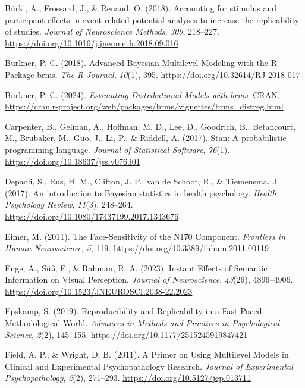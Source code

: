 \documentclass[
  doc,12pt,floatsintext]{apa7}
\newlength{\cslhangindent}
\newenvironment{CSLReferences}[2] %
 {\begin{list}{}{%
  \setlength{\itemindent}{0pt}
  \setlength{\leftmargin}{0pt}
  \setlength{\parsep}{0pt}
  \ifodd #1
   \setlength{\leftmargin}{\cslhangindent}
   \setlength{\itemindent}{-1\cslhangindent}
  \fi
  \setlength{\itemsep}{#2\baselineskip}}}
 {\end{list}}
\begin{document}
\begin{CSLReferences}{1}{0}
Bürki, A., Frossard, J., \& Renaud, O. (2018). Accounting for stimulus and participant effects in event-related potential analyses to increase the replicability of studies. \emph{Journal of Neuroscience Methods}, \emph{309}, 218--227. \url{https://doi.org/10.1016/j.jneumeth.2018.09.016}

Bürkner, P.-C. (2018). Advanced {Bayesian Multilevel Modeling} with the {R Package} brms. \emph{The R Journal}, \emph{10}(1), 395. \url{https://doi.org/10.32614/RJ-2018-017}

Bürkner, P.-C. (2024). \emph{Estimating {Distributional Models} with brms}. CRAN. \url{https://cran.r-project.org/web/packages/brms/vignettes/brms_distreg.html}

Carpenter, B., Gelman, A., Hoffman, M. D., Lee, D., Goodrich, B., Betancourt, M., Brubaker, M., Guo, J., Li, P., \& Riddell, A. (2017). Stan: A probabilistic programming language. \emph{Journal of Statistical Software}, \emph{76}(1). \url{https://doi.org/10.18637/jss.v076.i01}

Depaoli, S., Rus, H. M., Clifton, J. P., van de Schoot, R., \& Tiemensma, J. (2017). An introduction to {Bayesian} statistics in health psychology. \emph{Health Psychology Review}, \emph{11}(3), 248--264. \url{https://doi.org/10.1080/17437199.2017.1343676}

Eimer, M. (2011). The {Face-Sensitivity} of the {N170 Component}. \emph{Frontiers in Human Neuroscience}, \emph{5}, 119. \url{https://doi.org/10.3389/fnhum.2011.00119}

Enge, A., Süß, F., \& Rahman, R. A. (2023). Instant {Effects} of {Semantic Information} on {Visual Perception}. \emph{Journal of Neuroscience}, \emph{43}(26), 4896--4906. \url{https://doi.org/10.1523/JNEUROSCI.2038-22.2023}

Epskamp, S. (2019). Reproducibility and {Replicability} in a {Fast-Paced Methodological World}. \emph{Advances in Methods and Practices in Psychological Science}, \emph{2}(2), 145--155. \url{https://doi.org/10.1177/2515245919847421}

Field, A. P., \& Wright, D. B. (2011). A {Primer} on {Using Multilevel Models} in {Clinical} and {Experimental Psychopathology Research}. \emph{Journal of Experimental Psychopathology}, \emph{2}(2), 271--293. \url{https://doi.org/10.5127/jep.013711}


\end{CSLReferences}
\end{document}

